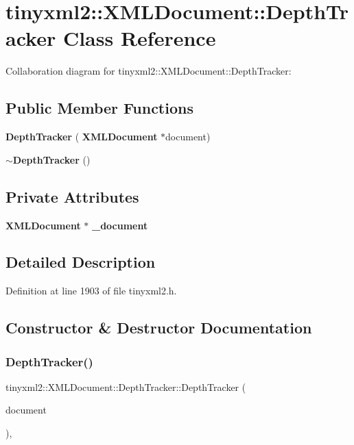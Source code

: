 \section{tinyxml2\+:\+:X\+M\+L\+Document\+:\+:Depth\+Tracker Class Reference}
\label{classtinyxml2_1_1_x_m_l_document_1_1_depth_tracker}


Collaboration diagram for tinyxml2\+:\+:X\+M\+L\+Document\+:\+:Depth\+Tracker\+:
\subsection*{Public Member Functions}
\begin{DoxyCompactItemize}
\item 
\textbf{ Depth\+Tracker} (\textbf{ X\+M\+L\+Document} $\ast$document)
\item 
\textbf{ $\sim$\+Depth\+Tracker} ()
\end{DoxyCompactItemize}
\subsection*{Private Attributes}
\begin{DoxyCompactItemize}
\item 
\textbf{ X\+M\+L\+Document} $\ast$ \textbf{ \+\_\+document}
\end{DoxyCompactItemize}


\subsection{Detailed Description}


Definition at line 1903 of file tinyxml2.\+h.



\subsection{Constructor \& Destructor Documentation}
\mbox{\label{classtinyxml2_1_1_x_m_l_document_1_1_depth_tracker_ac2782a163c2da773b84cb2c610b79bcb}} 
\subsubsection{Depth\+Tracker()}
{\footnotesize\ttfamily tinyxml2\+::\+X\+M\+L\+Document\+::\+Depth\+Tracker\+::\+Depth\+Tracker (\begin{DoxyParamCaption}\item[{\textbf{ X\+M\+L\+Document} $\ast$}]{document }\end{DoxyParamCaption})\hspace{0.3cm}{\ttfamily [inline]}, {\ttfamily [explicit]}}



